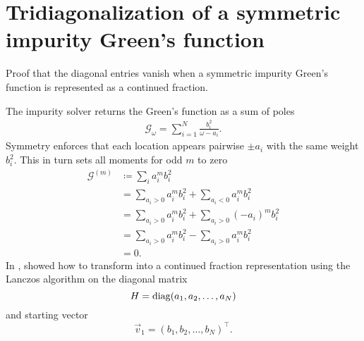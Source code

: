 \chapter{Tridiagonalization of a symmetric impurity Green's function}

Proof that the diagonal entries vanish when a symmetric impurity Green's function
is represented as a continued fraction.

The impurity solver returns the Green's function as a sum of poles
\begin{align}
    \mathcal{G}_{\!\omega} = \sum_{i=1}^N \frac{b_i^2}{\omega - a_i}.
    \label{eq:impurity-greens-function}
\end{align}
Symmetry enforces that each location appears pairwise $\pm a_i$
with the same weight $b_i^2$.
This in turn sets all moments for odd $m$ to zero
\begin{align}
    \mathcal{G}^{(m)}
     & \coloneqq
    \sum_i a_i^m b_i^2                                     \\
     & =
    \sum_{a_i>0} a_i^m b_i^2 + \sum_{a_i<0} a_i^m b_i^2    \\
     & =
    \sum_{a_i>0} a_i^m b_i^2 + \sum_{a_i>0} (-a_i)^m b_i^2 \\
     & =
    \sum_{a_i>0} a_i^m b_i^2 - \sum_{a_i>0} a_i^m b_i^2    \\
     & =
    0.
\end{align}
In \cite[appendix B]{Lu2014}, \citeauthor{Lu2014} showed how to transform
 into a continued fraction representation
using the Lanczos algorithm on the diagonal matrix
\begin{equation}
    H
    =
    \operatorname{diag}(a_1, a_2, \ldots, a_N)
\end{equation}
and starting vector
\begin{equation}
    \vec{v}_1 = (b_1, b_2, \ldots, b_N)^\intercal.
\end{equation}

